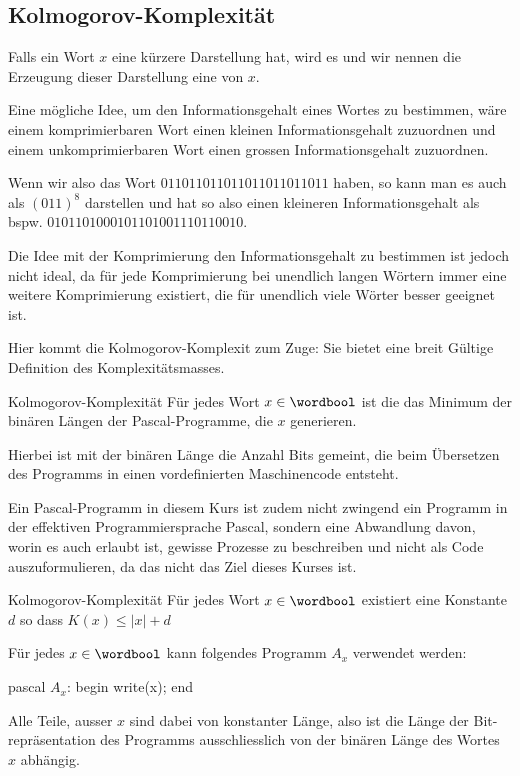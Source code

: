 \newpage
\subsection{Kolmogorov-Komplexität}
\setcounter{definitions}{17}
Falls ein Wort $x$ eine kürzere Darstellung hat, wird es  und wir nennen die Erzeugung dieser Darstellung eine  von $x$.

Eine mögliche Idee, um den Informationsgehalt eines Wortes zu bestimmen, wäre einem komprimierbaren Wort einen kleinen Informationsgehalt zuzuordnen und einem unkomprimierbaren Wort einen grossen Informationsgehalt zuzuordnen.

Wenn wir also das Wort $011011011011011011011011$ haben, so kann man es auch als $(011)^8$ darstellen und hat so also einen kleineren Informationsgehalt als bspw. $0101101000101101001110110010$.

Die Idee mit der Komprimierung den Informationsgehalt zu bestimmen ist jedoch nicht ideal, da für jede Komprimierung bei unendlich langen Wörtern immer eine weitere Komprimierung existiert, die für unendlich viele Wörter besser geeignet ist.

Hier kommt die Kolmogorov-Komplexit zum Zuge: Sie bietet eine breit Gültige Definition des Komplexitätsmasses.


\begin{definition}[]{Kolmogorov-Komplexität}
	Für jedes Wort $x \in \wordbool$ ist die  das Minimum der binären Längen der Pascal-Programme, die $x$ generieren.
\end{definition}

Hierbei ist mit der binären Länge die Anzahl Bits gemeint, die beim Übersetzen des Programms in einen vordefinierten Maschinencode entsteht.

Ein Pascal-Programm in diesem Kurs ist zudem nicht zwingend ein Programm in der effektiven Programmiersprache Pascal, sondern eine Abwandlung davon, worin es auch erlaubt ist, gewisse Prozesse zu beschreiben und nicht als Code auszuformulieren, da das nicht das Ziel dieses Kurses ist.


\begin{lemma}[]{Kolmogorov-Komplexität}
	Für jedes Wort $x \in \wordbool$ existiert eine Konstante $d$ so dass $K(x) \leq |x| + d$
\end{lemma}
\inlineproof Für jedes $x \in \wordbool$ kann folgendes Programm $A_x$ verwendet werden:

\begin{code}{pascal}
$A_x$: begin
        write(x);
     end
\end{code}
Alle Teile, ausser $x$ sind dabei von konstanter Länge, also ist die Länge der Bit-repräsentation des Programms ausschliesslich von der binären Länge des Wortes $x$ abhängig.

